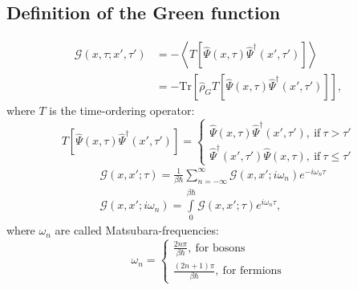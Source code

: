 \documentclass[11pt, a4paper]{article}
\newcommand{\Tr}[1]{\mathrm{Tr}\left[#1\right]}
\begin{document}
\subsection{Definition of the Green function}
\begin{align*}
    \mathcal G(x, \tau; x', \tau') & = -\left\langle T [\hat \Psi (x, \tau)\hat\Psi^{\dagger}(x', \tau')]\right\rangle \\
    & = - \Tr{\hat\rho_G T [\hat \Psi (x, \tau)\hat\Psi^{\dagger}(x', \tau')]},
\end{align*}
where $T$ is the time-ordering operator:
\begin{equation*}
    T[\hat \Psi (x, \tau)\hat\Psi^{\dagger}(x', \tau')] =
    \begin{cases}
        \hat \Psi (x, \tau)\hat\Psi^{\dagger}(x', \tau'), ~\textrm{if}~\tau>\tau' \\
        \hat\Psi^{\dagger}(x', \tau')\hat \Psi (x, \tau), ~\textrm{if}~\tau\leq\tau'
    \end{cases}
\end{equation*}
\begin{align*}
    &\mathcal G(x, x'; \tau) = \frac{1}{\beta\hbar}\sum\limits_{n=-\infty}^{\infty} \mathcal G(x, x'; i\omega_n)e^{-i\omega_n\tau} \\
    &\mathcal G(x, x'; i\omega_n) = \int\limits_{0}^{\beta\hbar}\mathcal G(x, x'; \tau)e^{i\omega_n\tau},
\end{align*}
where $\omega_n$ are called Matsubara-frequencies:
\begin{equation*}
    \omega_n = \begin{cases}
        \frac{2n\pi}{\beta\hbar}, ~ \textrm{for bosons}\\
        \frac{(2n+1)\pi}{\beta\hbar}, ~ \textrm{for fermions}
    \end{cases}
\end{equation*}


\newpage
\end{document}
